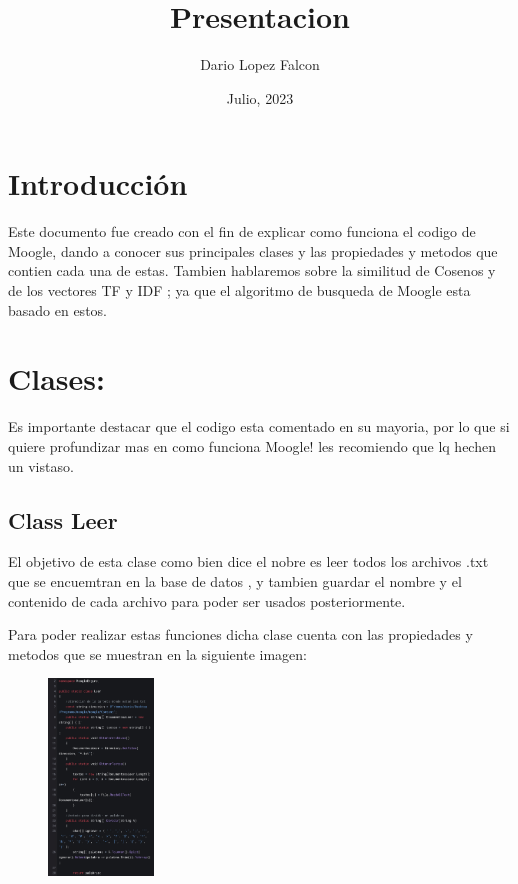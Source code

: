 \documentclass[a4paper,12pt]{article}
\begin{document}
\title{Presentacion}
\author{Dario Lopez Falcon}
\date{Julio, 2023}
\maketitle


\section{Introducción}\label{sec:intro}

    Este documento fue creado con el fin de explicar como funciona el codigo de Moogle, dando a conocer sus principales
    clases y las propiedades y metodos que contien cada una de estas.
    Tambien hablaremos sobre la similitud de Cosenos y de los vectores TF y IDF ; ya que el algoritmo de busqueda de Moogle
    esta basado en estos.

\section{Clases:}\label{sec:cls}

   Es importante destacar que el codigo esta comentado en su mayoria, por lo que si quiere profundizar mas en como funciona 
 Moogle! les recomiendo que lq hechen un vistaso.

\subsection{Class Leer }\label{sub:Leer}

    El objetivo de esta clase como bien dice el nobre es leer todos los archivos .txt que se encuemtran en la base de datos , y tambien 
    guardar el nombre y el contenido de cada archivo para poder ser usados posteriormente.

    Para poder realizar estas funciones dicha clase cuenta con las propiedades y metodos que se muestran en la siguiente imagen:

\begin{figure}[H]
    \centering
    \includegraphics[width=0.25\textwidth]{imagenes/1.jpg}
\end{figure}
\end{document}
